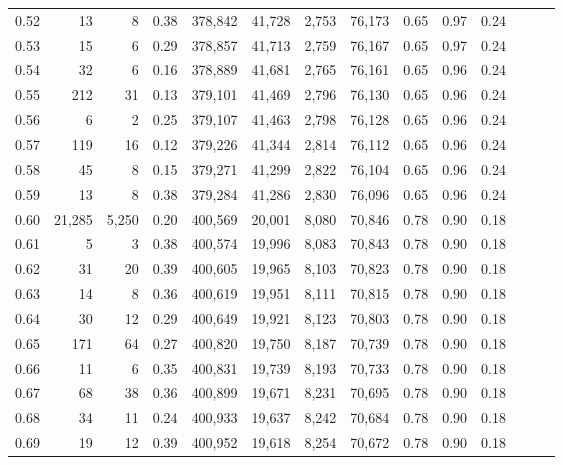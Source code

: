 \begin{tabular}{rrrrrrrrrrrrrr}
0.52 &      13 &       8 &  0.38 &  378,842 &   41,728 &   2,753 &  76,173 &  0.65 &  0.97 &      0.24 \\
0.53 &      15 &       6 &  0.29 &  378,857 &   41,713 &   2,759 &  76,167 &  0.65 &  0.97 &      0.24 \\
0.54 &      32 &       6 &  0.16 &  378,889 &   41,681 &   2,765 &  76,161 &  0.65 &  0.96 &      0.24 \\
0.55 &     212 &      31 &  0.13 &  379,101 &   41,469 &   2,796 &  76,130 &  0.65 &  0.96 &      0.24 \\
0.56 &       6 &       2 &  0.25 &  379,107 &   41,463 &   2,798 &  76,128 &  0.65 &  0.96 &      0.24 \\
0.57 &     119 &      16 &  0.12 &  379,226 &   41,344 &   2,814 &  76,112 &  0.65 &  0.96 &      0.24 \\
0.58 &      45 &       8 &  0.15 &  379,271 &   41,299 &   2,822 &  76,104 &  0.65 &  0.96 &      0.24 \\
0.59 &      13 &       8 &  0.38 &  379,284 &   41,286 &   2,830 &  76,096 &  0.65 &  0.96 &      0.24 \\
0.60 &  21,285 &   5,250 &  0.20 &  400,569 &   20,001 &   8,080 &  70,846 &  0.78 &  0.90 &      0.18 \\
0.61 &       5 &       3 &  0.38 &  400,574 &   19,996 &   8,083 &  70,843 &  0.78 &  0.90 &      0.18 \\
0.62 &      31 &      20 &  0.39 &  400,605 &   19,965 &   8,103 &  70,823 &  0.78 &  0.90 &      0.18 \\
0.63 &      14 &       8 &  0.36 &  400,619 &   19,951 &   8,111 &  70,815 &  0.78 &  0.90 &      0.18 \\
0.64 &      30 &      12 &  0.29 &  400,649 &   19,921 &   8,123 &  70,803 &  0.78 &  0.90 &      0.18 \\
0.65 &     171 &      64 &  0.27 &  400,820 &   19,750 &   8,187 &  70,739 &  0.78 &  0.90 &      0.18 \\
0.66 &      11 &       6 &  0.35 &  400,831 &   19,739 &   8,193 &  70,733 &  0.78 &  0.90 &      0.18 \\
0.67 &      68 &      38 &  0.36 &  400,899 &   19,671 &   8,231 &  70,695 &  0.78 &  0.90 &      0.18 \\
0.68 &      34 &      11 &  0.24 &  400,933 &   19,637 &   8,242 &  70,684 &  0.78 &  0.90 &      0.18 \\
0.69 &      19 &      12 &  0.39 &  400,952 &   19,618 &   8,254 &  70,672 &  0.78 &  0.90 &      0.18 \\

\end{tabular}
